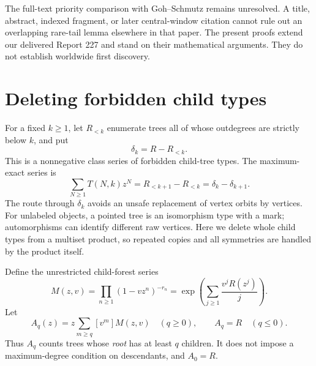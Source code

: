 \documentclass[11pt,letterpaper]{article}
\theoremstyle{definition}\newtheorem{definition}[theorem]{Definition}
\theoremstyle{remark}\newtheorem{remark}[theorem]{Remark}
\begin{document}
The full-text priority comparison with Goh--Schmutz \cite{goh} remains unresolved. A title, abstract, indexed fragment, or later central-window citation cannot rule out an overlapping rare-tail lemma elsewhere in that paper. The present proofs extend our delivered Report 227 and stand on their mathematical arguments. They do not establish worldwide first discovery.

\section{Deleting forbidden child types}\label{hod:three:sec:deletion}
For a fixed $k\ge1$, let $R_{<k}$ enumerate trees all of whose outdegrees are strictly below $k$, and put
\begin{equation}\label{hod:three:eq:delta}
\delta_k=R-R_{<k}.
\end{equation}
This is a nonnegative class series of forbidden child-tree types. The maximum-exact series is
\begin{equation}\label{hod:three:eq:exactdifference}
\sum_{N\ge1}T(N,k)z^N=R_{<k+1}-R_{<k}=\delta_k-\delta_{k+1}.
\end{equation}
The route through $\delta_k$ avoids an unsafe replacement of vertex orbits by vertices. For unlabeled objects, a pointed tree is an isomorphism type with a mark; automorphisms can identify different raw vertices. Here we delete whole child types from a multiset product, so repeated copies and all symmetries are handled by the product itself.

Define the unrestricted child-forest series
\[
M(z,v)=\prod_{n\ge1}(1-vz^n)^{-r_n}
=\exp\!\left(\sum_{j\ge1}\frac{v^jR(z^j)}j\right).
\]
Let
\begin{equation}\label{hod:three:eq:Aq}
A_q(z)=z\sum_{m\ge q}[v^m]M(z,v)\quad(q\ge0),\qquad A_q=R\quad(q\le0).
\end{equation}
Thus $A_q$ counts trees whose \emph{root} has at least $q$ children. It does not impose a maximum-degree condition on descendants, and $A_0=R$.
\end{document}
